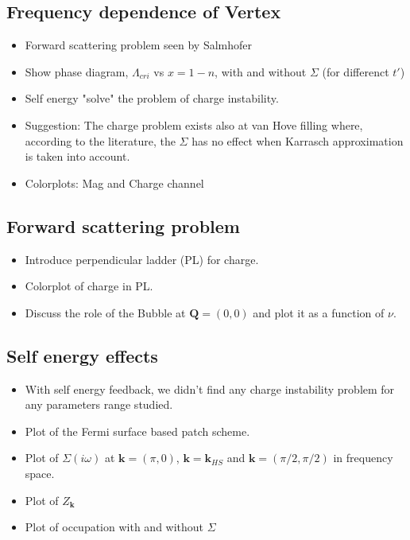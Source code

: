 \subsection{Frequency dependence of Vertex}

\begin{itemize}

\item Forward scattering problem seen by Salmhofer

\item Show phase diagram, $\Lambda_{cri}$ vs $x=1-n$, with and without $\Sigma$ 
          (for differenct $t'$)
          
\item Self energy "solve" the problem of charge instability.

\item Suggestion: The charge problem exists also at van Hove filling where, according to the literature, 
           the $\Sigma$ has no effect when Karrasch approximation is taken into account.

\item  Colorplots: Mag and Charge channel

\end{itemize}

\subsection{Forward scattering problem}

\begin{itemize}

\item Introduce perpendicular ladder (PL) for charge.

\item Colorplot of charge in PL.

\item Discuss the role of the Bubble at $\boldsymbol{Q}=(0,0)$ and plot it as a function of $\nu$.

\end{itemize}

\subsection{Self energy effects}

\begin{itemize}

\item With self energy feedback, we didn't find any charge instability problem for any parameters range studied.

\item Plot of the Fermi surface based patch scheme.

\item Plot of $\Sigma(i\omega)$ at $\boldsymbol{k}=(\pi,0)$, $\boldsymbol{k}=\boldsymbol{k}_{HS}$ and $\boldsymbol{k}=(\pi/2,\pi/2)$ in frequency space.

\item Plot of $Z_{\boldsymbol{k}}$

\item Plot of occupation with and without $\Sigma$

\end{itemize}